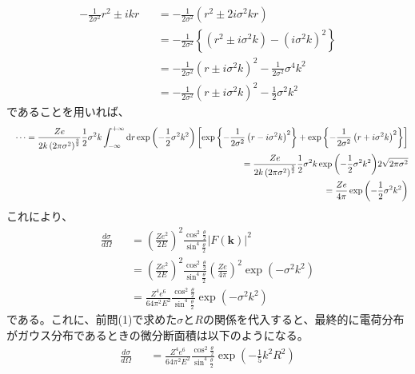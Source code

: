 \documentclass[a4j,fleqn]{jsarticle}
\begin{document}
        \begin{eqnarray}
            -\frac{1}{2\sigma^2}r^2\pm{ikr}&&=-\frac{1}{2\sigma^2}\left(r^2\pm2i\sigma^2kr\right)\\
            &&=-\frac{1}{2\sigma^2}\left\{\left(r^2\pm{i\sigma^2k}\right)-\left(i\sigma^2k\right)^2\right\}\\
            &&=-\frac{1}{2\sigma^2}\left(r\pm{i\sigma^2k}\right)^2-\frac{1}{2\sigma^2}\sigma^4k^2\\
            &&=-\frac{1}{2\sigma^2}\left(r\pm{i\sigma^2k}\right)^2-\frac{1}{2}\sigma^2k^2
        \end{eqnarray}
        であることを用いれば、
        \begin{eqnarray}
            \nonumber&&\cdots=\frac{Ze}{2k\left(2\pi\sigma^2\right)^{\frac{3}{2}}}\frac{1}{2}\sigma^2k\int_{-\infty}^{+\infty}{{\rm{d}}r\exp{\left(-\frac{1}{2}\sigma^2k^2\right)}\left[\exp{\left\{-\frac{1}{2\sigma^2}\left(r-{i\sigma^2k}\right)^2\right\}}+\exp{\left\{-\frac{1}{2\sigma^2}\left(r+{i\sigma^2k}\right)^2\right\}}\right]}\\
            \nonumber&&=\frac{Ze}{2k\left(2\pi\sigma^2\right)^{\frac{3}{2}}}\frac{1}{2}\sigma^2k\exp{\left(-\frac{1}{2}\sigma^2k^2\right)}2\sqrt{2\pi\sigma^2}\\
            &&=\frac{Ze}{4\pi}\exp{\left(-\frac{1}{2}\sigma^2k^2\right)}
        \end{eqnarray}
        これにより、
        \begin{eqnarray}
            \frac{d\sigma}{d\Omega}&&=\left(\frac{Ze^2}{2E}\right)^2\frac{\cos^2{\frac{\theta}{2}}}{\sin^4{\frac{\theta}{2}}}\left|F(\bm{k})\right|^2\\
            &&=\left(\frac{Ze^2}{2E}\right)^2\frac{\cos^2{\frac{\theta}{2}}}{\sin^4{\frac{\theta}{2}}}\left(\frac{Ze}{4\pi}\right)^2\exp{\left(-\sigma^2k^2\right)}\\
            &&=\frac{Z^4e^6}{64\pi^2E^2}\frac{\cos^2{\frac{\theta}{2}}}{\sin^4{\frac{\theta}{2}}}\exp{\left(-\sigma^2k^2\right)}
        \end{eqnarray}
        である。これに、前問(1)で求めた$\sigma$と$R$の関係を代入すると、最終的に電荷分布がガウス分布であるときの微分断面積は以下のようになる。
        \begin{eqnarray}
            \frac{d\sigma}{d\Omega}&&=\frac{Z^4e^6}{64\pi^2E^2}\frac{\cos^2{\frac{\theta}{2}}}{\sin^4{\frac{\theta}{2}}}\exp{\left(-\frac{1}{5}k^2R^2\right)}
        \end{eqnarray}
\end{document}
